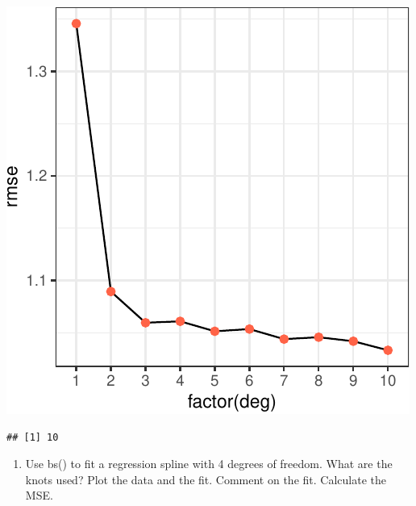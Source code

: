 \documentclass[]{article}
\newenvironment{Shaded}{\begin{snugshade}}{\end{snugshade}}
\newcommand{\DataTypeTok}[1]{\textcolor[rgb]{0.13,0.29,0.53}{#1}}
\newcommand{\DecValTok}[1]{\textcolor[rgb]{0.00,0.00,0.81}{#1}}
\newcommand{\KeywordTok}[1]{\textcolor[rgb]{0.13,0.29,0.53}{\textbf{#1}}}
\newcommand{\NormalTok}[1]{#1}
\newcommand{\OperatorTok}[1]{\textcolor[rgb]{0.81,0.36,0.00}{\textbf{#1}}}
\newcommand{\StringTok}[1]{\textcolor[rgb]{0.31,0.60,0.02}{#1}}
\providecommand{\tightlist}{%
  \setlength{\itemsep}{0pt}\setlength{\parskip}{0pt}}
\begin{document}
\begin{center}\includegraphics{sol_A4_files/figure-latex/unnamed-chunk-3-1} \end{center}

\begin{Shaded}
\end{Shaded}

\begin{verbatim}
## [1] 10
\end{verbatim}

\begin{enumerate}
\def\labelenumi{(\alph{enumi})}
\setcounter{enumi}{4}
\tightlist
\item
  Use bs() to fit a regression spline with 4 degrees of freedom. What
  are the knots used? Plot the data and the fit. Comment on the fit.
  Calculate the MSE.
\end{enumerate}

\begin{Shaded}
\end{Shaded}
\end{document}

